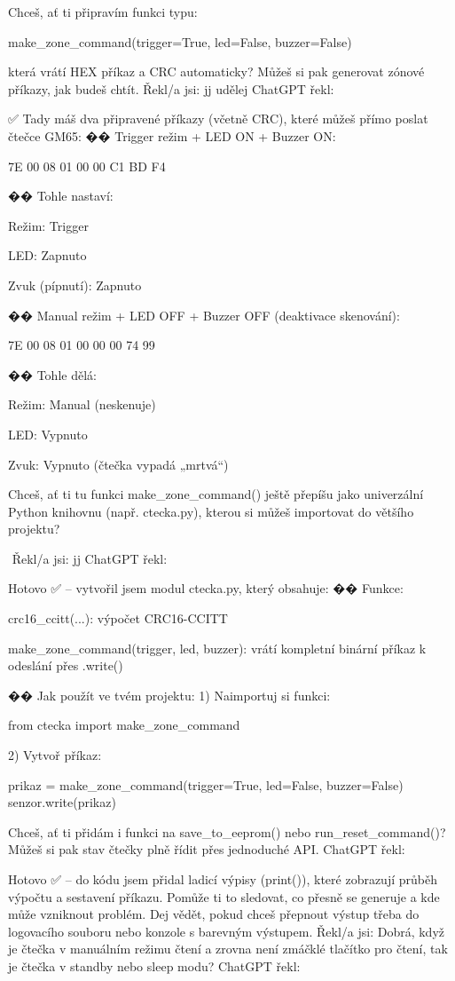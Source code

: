 Chceš, ať ti připravím funkci typu:

make_zone_command(trigger=True, led=False, buzzer=False)

která vrátí HEX příkaz a CRC automaticky? Můžeš si pak generovat zónové příkazy, jak budeš chtít.
Řekl/a jsi:
jj udělej
ChatGPT řekl:

✅ Tady máš dva připravené příkazy (včetně CRC), které můžeš přímo poslat čtečce GM65:
�� Trigger režim + LED ON + Buzzer ON:

7E 00 08 01 00 00 C1 BD F4

�� Tohle nastaví:

    Režim: Trigger

    LED: Zapnuto

    Zvuk (pípnutí): Zapnuto

�� Manual režim + LED OFF + Buzzer OFF (deaktivace skenování):

7E 00 08 01 00 00 00 74 99

�� Tohle dělá:

    Režim: Manual (neskenuje)

    LED: Vypnuto

    Zvuk: Vypnuto
    (čtečka vypadá „mrtvá“)

Chceš, ať ti tu funkci make_zone_command() ještě přepíšu jako univerzální Python knihovnu (např. ctecka.py), kterou si můžeš importovat do většího projektu? ​

​
Řekl/a jsi:
jj
ChatGPT řekl:

Hotovo ✅ – vytvořil jsem modul ctecka.py, který obsahuje:
�� Funkce:

    crc16_ccitt(...): výpočet CRC16-CCITT

    make_zone_command(trigger, led, buzzer): vrátí kompletní binární příkaz k odeslání přes .write()

�� Jak použít ve tvém projektu:
1) Naimportuj si funkci:

from ctecka import make_zone_command

2) Vytvoř příkaz:

prikaz = make_zone_command(trigger=True, led=False, buzzer=False)
senzor.write(prikaz)

Chceš, ať ti přidám i funkci na save_to_eeprom() nebo run_reset_command()? Můžeš si pak stav čtečky plně řídit přes jednoduché API.
ChatGPT řekl:

Hotovo ✅ – do kódu jsem přidal ladicí výpisy (print()), které zobrazují průběh výpočtu a sestavení příkazu. Pomůže ti to sledovat, co přesně se generuje a kde může vzniknout problém. Dej vědět, pokud chceš přepnout výstup třeba do logovacího souboru nebo konzole s barevným výstupem.
Řekl/a jsi:
Dobrá, když je čtečka v manuálním režimu čtení a zrovna není zmáčklé tlačítko pro čtení, tak je čtečka v standby nebo sleep modu?
ChatGPT řekl:

